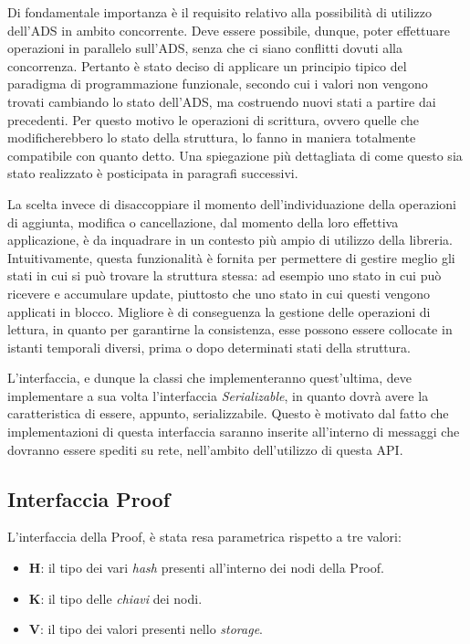 		Di fondamentale importanza è il requisito relativo alla possibilità di utilizzo dell'ADS in ambito concorrente. Deve essere possibile, dunque, poter effettuare operazioni in parallelo sull'ADS, senza che ci siano conflitti dovuti alla concorrenza. Pertanto è stato deciso di applicare un principio tipico del paradigma di programmazione funzionale, secondo cui i valori non vengono trovati cambiando lo stato dell'ADS, ma costruendo nuovi stati a partire dai precedenti. Per questo motivo le operazioni di scrittura, ovvero quelle che modificherebbero lo stato della struttura, lo fanno in maniera totalmente compatibile con quanto detto. Una spiegazione più dettagliata di come questo sia stato realizzato è posticipata in paragrafi successivi.
		
		La scelta invece di disaccoppiare il momento dell'individuazione della operazioni di aggiunta, modifica o cancellazione, dal momento della loro effettiva applicazione, è da inquadrare in un contesto più ampio di utilizzo della libreria. Intuitivamente, questa funzionalità è fornita per permettere di gestire meglio gli stati in cui si può trovare la struttura stessa: ad esempio uno stato in cui può ricevere e accumulare update, piuttosto che uno stato in cui questi vengono applicati in blocco. Migliore è di conseguenza la gestione delle operazioni di lettura, in quanto per garantirne la consistenza, esse possono essere collocate in istanti temporali diversi, prima o dopo determinati stati della struttura.
		
		L'interfaccia, e dunque la classi che implementeranno quest'ultima, deve implementare a sua volta l'interfaccia \textit{Serializable}, in quanto dovrà avere la caratteristica di essere, appunto, serializzabile. Questo è motivato dal fatto che implementazioni di questa interfaccia saranno inserite all'interno di messaggi che dovranno essere spediti su rete, nell'ambito dell'utilizzo di questa API.
	
	\subsection{Interfaccia Proof}
	
		
		L'interfaccia della Proof, è stata resa parametrica rispetto a tre valori:
		
		\begin{itemize}
			\item \textbf{H}: il tipo dei vari \textit{hash} presenti all'interno dei nodi della Proof.
			\item \textbf{K}: il tipo delle \textit{chiavi} dei nodi.
			\item \textbf{V}: il tipo dei valori presenti nello \textit{storage}. 
		\end{itemize}
		
